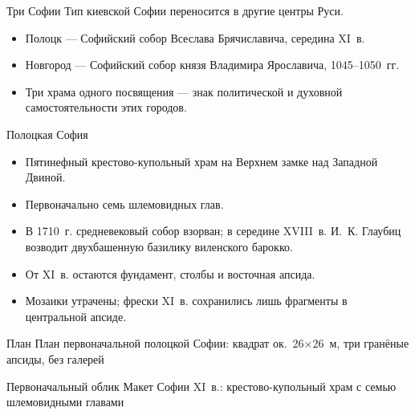 \begin{frame}{Три Софии}
  Тип киевской Софии переносится в другие центры Руси.
  \begin{itemize}
    \item Полоцк --- Софийский собор Всеслава Брячиславича,
          середина XI~в.
    \item Новгород --- Софийский собор князя Владимира Ярославича,
          1045--1050~гг.
    \item Три храма одного посвящения --- знак политической
          и духовной самостоятельности этих городов.
  \end{itemize}
\end{frame}

\begin{frame}{Полоцкая София}
  \begin{itemize}
    \item Пятинефный крестово-купольный храм на Верхнем замке
          над Западной Двиной.
    \item Первоначально семь шлемовидных глав.
    \item В 1710~г. средневековый собор взорван;
          в середине XVIII~в. И.~К. Глаубиц возводит
          двухбашенную базилику виленского барокко.
    \item От XI~в. остаются фундамент, столбы и восточная апсида.
    \item Мозаики утрачены; фрески XI~в. сохранились лишь фрагменты
          в центральной апсиде.
  \end{itemize}
\end{frame}

\begin{frame}{План}
    {План первоначальной полоцкой Софии:
     квадрат ок.\ 26$\times$26~м, три гранёные апсиды, без галерей}
\end{frame}

\begin{frame}{Первоначальный облик}
    {Макет Софии XI~в.: крестово-купольный храм
     с семью шлемовидными главами}
\end{frame}

